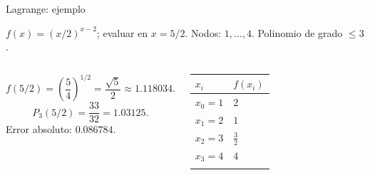 \documentclass[original_version/main.tex]{subfiles}
\begin{document}
\begin{frame}[t]{Lagrange: ejemplo}
\par\noindent\begin{minipage}[t][7.5mm][t]{\textwidth}\small\strut $f(x)=(x/2)^{x-2}$; evaluar en $x=5/2$. Nodos: $1,\ldots,4$. Polinomio de grado $\le 3$.\end{minipage}\par\nointerlineskip
\begin{columns}[T]\small\setlength{\abovedisplayskip}{4pt}\setlength{\belowdisplayskip}{4pt}\[f(5/2)=\left(\frac54\right)^{1/2}=\frac{\sqrt5}{2}\approx1.118034.\]\[P_3(5/2)=\frac{33}{32}=1.03125.\]\small Error absoluto: $0.086784$.\begingroup\small\setlength{\tabcolsep}{3pt}\begin{center}\begin{tabular}{|C{.42\textwidth}|C{.42\textwidth}|}\hline
\rule[-2mm]{0pt}{6mm}$x_i$&$f(x_i)$\\\hline
\rule[-2.5mm]{0pt}{6mm}$x_0=1$&$2$\\\hline
\rule[-2.5mm]{0pt}{6mm}$x_1=2$&$1$\\\hline
\rule[-2.5mm]{0pt}{6mm}$x_2=3$&$\frac{3}{2}$\\\hline
\rule[-2.5mm]{0pt}{6mm}$x_3=4$&$4$\\\hline
\rule[-2.5mm]{0pt}{6mm}&\\\hline
\end{tabular}\end{center}\endgroup\par
\end{columns}
\end{frame}
\end{document}
